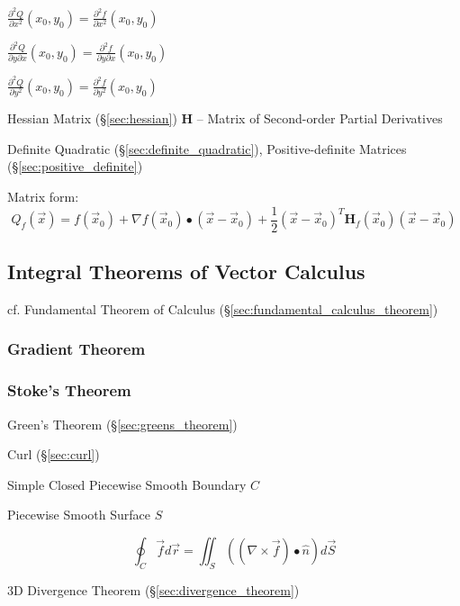 {$\frac{\partial^2{Q}}{\partial{x^2}}(x_0,y_0) =
  \frac{\partial^2{f}}{\partial{x^2}}(x_0,y_0)$

$\frac{\partial^2{Q}}{\partial{y}\partial{x}}(x_0,y_0) =
  \frac{\partial^2{f}}{\partial{y}\partial{x}}(x_0,y_0)$

$\frac{\partial^2{Q}}{\partial{y^2}}(x_0,y_0) =
  \frac{\partial^2{f}}{\partial{y^2}}(x_0,y_0)$

\fist Hessian Matrix (\S\ref{sec:hessian}) $\mathbf{H}$ -- Matrix of
Second-order Partial Derivatives

\fist Definite Quadratic (\S\ref{sec:definite_quadratic}), Positive-definite
Matrices (\S\ref{sec:positive_definite})

Matrix form:
\[
  Q_f(\vec{x}) = f(\vec{x}_0) + \nabla{f(\vec{x}_0)}\bullet (\vec{x}-\vec{x}_0)
  + \frac{1}{2}(\vec{x}-\vec{x}_0)^T\mathbf{H}_f(\vec{x}_0)(\vec{x}-\vec{x}_0)
\]



\subsection{Integral Theorems of Vector Calculus}
\label{sec:integral_theorems}

cf. Fundamental Theorem of Calculus (\S\ref{sec:fundamental_calculus_theorem})



\subsubsection{Gradient Theorem}\label{sec:gradient_theorem}

\subsubsection{Stoke's Theorem}\label{sec:stokes_theorem}

\fist Green's Theorem (\S\ref{sec:greens_theorem})

Curl (\S\ref{sec:curl})

Simple Closed Piecewise Smooth Boundary $C$

Piecewise Smooth Surface $S$

\[
  \oint_C \vec{f} d\vec{r}
    = \iint_S ((\nabla \times \vec{f}) \bullet \hat{n}) d\vec{S}
\]

\fist 3D Divergence Theorem (\S\ref{sec:divergence_theorem})



}
